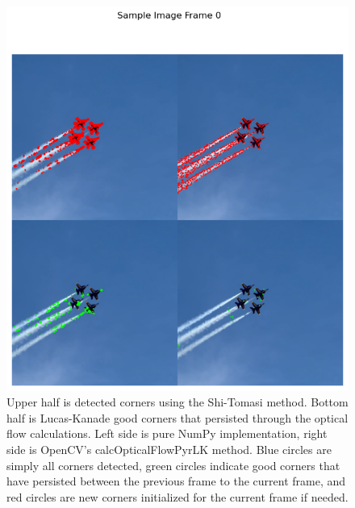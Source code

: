 \documentclass[11pt, conference, letterpaper]{IEEEtran}
\begin{document}
\onecolumn
\begin{figure}[t]
    \centering
    \includegraphics[width=0.8\linewidth]{images/sample_image_0.png}
    \caption{Upper half is detected corners using the Shi-Tomasi method. Bottom half is Lucas-Kanade good corners that persisted through the optical flow calculations. Left side is pure NumPy implementation, right side is OpenCV's calcOpticalFlowPyrLK method. Blue circles are simply all corners detected, green circles indicate good corners that have persisted between the previous frame to the current frame, and red circles are new corners initialized for the current frame if needed.}
    \label{fig:sample_1}
\end{figure}
\end{document}
